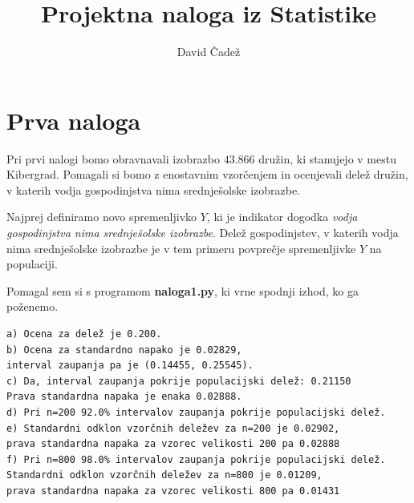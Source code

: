 \documentclass{article}
\title{Projektna naloga iz Statistike}
\author{David Čadež}
\date{}
\begin{document}
\maketitle

\section{Prva naloga}

Pri prvi nalogi bomo obravnavali izobrazbo $43.866$ družin, ki stanujejo v mestu
Kibergrad. Pomagali si bomo z enostavnim vzorčenjem in ocenjevali delež družin,
v katerih vodja gospodinjstva nima srednješolske izobrazbe.

Najprej definiramo novo spremenljivko $Y$, ki je indikator dogodka \emph{vodja
gospodinjstva nima srednješolske izobrazbe}. Delež gospodinjstev, v katerih
vodja nima srednješolske izobrazbe je v tem primeru povprečje spremenljivke $Y$
na populaciji.

Pomagal sem si s programom \textbf{naloga1.py}, ki vrne spodnji izhod, ko ga
poženemo.
\begin{verbatim}
a) Ocena za delež je 0.200.
b) Ocena za standardno napako je 0.02829,
interval zaupanja pa je (0.14455, 0.25545).
c) Da, interval zaupanja pokrije populacijski delež: 0.21150
Prava standardna napaka je enaka 0.02888.
d) Pri n=200 92.0% intervalov zaupanja pokrije populacijski delež.
e) Standardni odklon vzorčnih deležev za n=200 je 0.02902,
prava standardna napaka za vzorec velikosti 200 pa 0.02888
f) Pri n=800 98.0% intervalov zaupanja pokrije populacijski delež.
Standardni odklon vzorčnih deležev za n=800 je 0.01209,
prava standardna napaka za vzorec velikosti 800 pa 0.01431
\end{verbatim}
\end{document}
